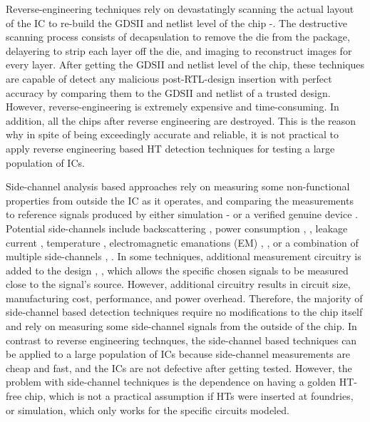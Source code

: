 \documentclass[journal]{IEEEtran}
\begin{document}
Reverse-engineering techniques rely on devastatingly scanning the actual layout of the IC to re-build the GDSII and netlist level of the chip \cite{torrance2009state}-\nocite{nasr2017efficient,fyrbiak2018hal,7293657,8031551,6783305}\cite{7428081}. The destructive scanning process consists of decapsulation to remove the die from the package, delayering to strip each layer off the die, and imaging to reconstruct images for every layer. After getting the GDSII and netlist level of the chip, these techniques are capable of detect any malicious post-RTL-design insertion with perfect accuracy by comparing them to the GDSII and netlist of a trusted design. However, reverse-engineering is extremely expensive and time-consuming. In addition, all the chips after reverse engineering are destroyed. This is the reason why in spite of being exceedingly accurate and reliable, it is not practical to apply reverse engineering based HT detection techniques for testing a large population of ICs.

Side-channel analysis based approaches rely on measuring some non-functional properties from outside the IC as it operates, and
comparing the measurements to reference signals produced by either simulation \cite{he2017hardware}-\nocite{8064895}\cite{8809738} or a verified genuine device \cite{8701559}. Potential side-channels include backscattering \cite{8701559}, power consumption \cite{agrawal2007trojan}, \cite{banga2008region}, leakage current \cite{7107361}, temperature \cite{bao2015temperature}, electromagnetic emanations (EM) \cite{he2017hardware}, \cite{ngo2016method}, or a combination of multiple side-channels \cite{hu2013high}, \cite{nowroz2014novel}. In some techniques, additional measurement circuitry is added to the design \cite{cha2013trojan}, \cite{lecomte2017chip}, which allows the specific
chosen signals to be measured close to the signal’s source. However, additional circuitry results in circuit size, manufacturing cost, performance, and power overhead. Therefore, the majority of side-channel based detection techniques require no modifications to the chip itself and rely on measuring some side-channel signals from the outside of the chip. In contrast to reverse engineering technques, the side-channel based techniques can be applied to a large population of ICs because side-channel measurements are cheap and fast, and the ICs are not defective after getting tested. However, the problem with side-channel techniques is the dependence on having a golden HT-free chip, which is not a practical assumption if HTs were inserted at foundries, or simulation, which only works for the specific circuits modeled. 
\end{document}
